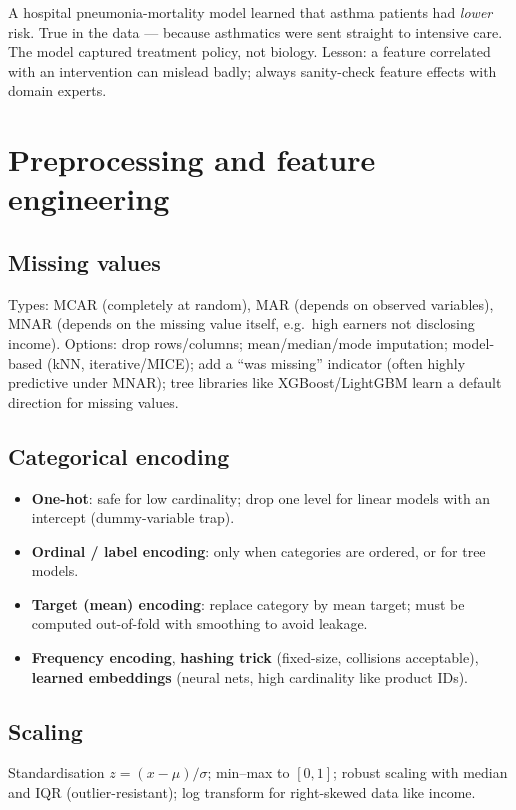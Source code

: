 \begin{realworld}
A hospital pneumonia-mortality model learned that asthma patients had \emph{lower} risk. True in the data --- because asthmatics were sent straight to intensive care. The model captured treatment policy, not biology. Lesson: a feature correlated with an intervention can mislead badly; always sanity-check feature effects with domain experts.
\end{realworld}

\section{Preprocessing and feature engineering}

\subsection{Missing values}
Types: MCAR (completely at random), MAR (depends on observed variables), MNAR (depends on the missing value itself, e.g.\ high earners not disclosing income). Options: drop rows/columns; mean/median/mode imputation; model-based (kNN, iterative/MICE); add a ``was missing'' indicator (often highly predictive under MNAR); tree libraries like XGBoost/LightGBM learn a default direction for missing values.

\subsection{Categorical encoding}
\begin{itemize}
  \item \textbf{One-hot}: safe for low cardinality; drop one level for linear models with an intercept (dummy-variable trap).
  \item \textbf{Ordinal / label encoding}: only when categories are ordered, or for tree models.
  \item \textbf{Target (mean) encoding}: replace category by mean target; must be computed out-of-fold with smoothing to avoid leakage.
  \item \textbf{Frequency encoding}, \textbf{hashing trick} (fixed-size, collisions acceptable), \textbf{learned embeddings} (neural nets, high cardinality like product IDs).
\end{itemize}

\subsection{Scaling}
Standardisation $z=(x-\mu)/\sigma$; min--max to $[0,1]$; robust scaling with median and IQR (outlier-resistant); log transform for right-skewed data like income.

